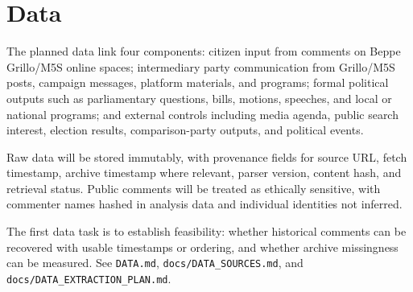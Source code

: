 \section{Data}\label{sec:data}

The planned data link four components: citizen input from comments on Beppe Grillo/M5S online spaces; intermediary party communication from Grillo/M5S posts, campaign messages, platform materials, and programs; formal political outputs such as parliamentary questions, bills, motions, speeches, and local or national programs; and external controls including media agenda, public search interest, election results, comparison-party outputs, and political events.

Raw data will be stored immutably, with provenance fields for source URL, fetch timestamp, archive timestamp where relevant, parser version, content hash, and retrieval status. Public comments will be treated as ethically sensitive, with commenter names hashed in analysis data and individual identities not inferred.

The first data task is to establish feasibility: whether historical comments can be recovered with usable timestamps or ordering, and whether archive missingness can be measured. See \texttt{DATA.md}, \texttt{docs/DATA\_SOURCES.md}, and \texttt{docs/DATA\_EXTRACTION\_PLAN.md}.

